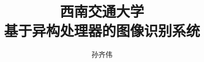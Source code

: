 \documentclass[bachelor]{swjtuthesis}
\title{西南交通大学\\基于异构处理器的图像识别系统}
\author{孙齐伟}
\begin{document}
\maketitle

%

\frontmatter

\tableofcontents
\listoffigures
\listoftables
% 


\mainmatter








% 
% 
% 
\nocite{*}


\appendix


\backmatter


\end{document}
